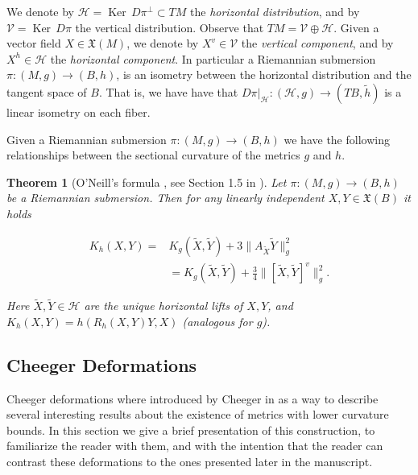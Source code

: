 \documentclass[12pt,a4paper,reqno]{amsart}
\DeclareMathOperator{\kernel}{Ker}
\newcommand{\1}{\mathbbm{1}} %
\newcommand{\hor}{\mathcal{H}}
\newcommand{\ver}{\mathcal{V}}
\newtheorem{thm}{Theorem}[section]
\theoremstyle{definition}
\theoremstyle{TheoremNum}
\begin{document}
We denote by $\hor = \kernel\, D\pi^\perp \subset TM$ the \emph{horizontal distribution}, and by $\ver = \kernel\, D\pi$ the vertical distribution. Observe that $TM = \ver\oplus \hor$. Given a vector field $X\in \mathfrak{X}(M)$, we denote by  $X^v\in \ver$ the \emph{vertical component}, and by $X^h\in \hor$ the \emph{horizontal component}. In particular  a Riemannian submersion $\pi\colon (M,g)\to (B,h)$, is an isometry between the horizontal distribution and the tangent space of $B$. That is, we have have that $D\pi|_{\hor}\colon (\hor,g)\to (TB,\tilde{h})$ is a linear isometry on each fiber. 

Given a Riemannian submersion $\pi\colon (M,g)\to (B,h)$ we have the following relationships between the sectional curvature of the metrics $g$ and $h$.

\begin{thm}[O'Neill's formula \cite{ONeill1966}, see Section 1.5 in \cite{GromollWalschap}]\th\label{T: ONeills formula}
Let $\pi\colon (M,g)\to (B,h)$ be a Riemannian submersion. Then for any linearly independent $X,Y\in \mathfrak{X}(B)$ it holds
\begin{linenomath}
\begin{align*}
K_h(X,Y) =& K_g(\widetilde{X},\widetilde{Y})+3\Big\|A_{\widetilde{X}}\widetilde{Y}\Big\|^2_g\\
&=K_g(\widetilde{X},\widetilde{Y})+\frac{3}{4}\Big\|[\widetilde{X},\widetilde{Y}]^v\Big\|^2_g.
\end{align*}
\end{linenomath}
Here $\widetilde{X},\widetilde{Y}\in \hor$ are the unique horizontal lifts of $X,Y$, and $K_h(X,Y) = h(R_h(X,Y)Y,X)$ (analogous for $g$).
\end{thm}


\subsection{Cheeger Deformations}\label{S: Cheeger Deformations} Cheeger deformations where introdu\-ced by Che\-eger in \cite{Cheeger1973} as a way to describe several interesting results about the existence of metrics with lower curvature bounds. In this section we give a brief presentation of this construction, to familiarize the reader with them, and with the intention that the reader can contrast these deformations to the ones presented later in the manuscript. 
\end{document}
